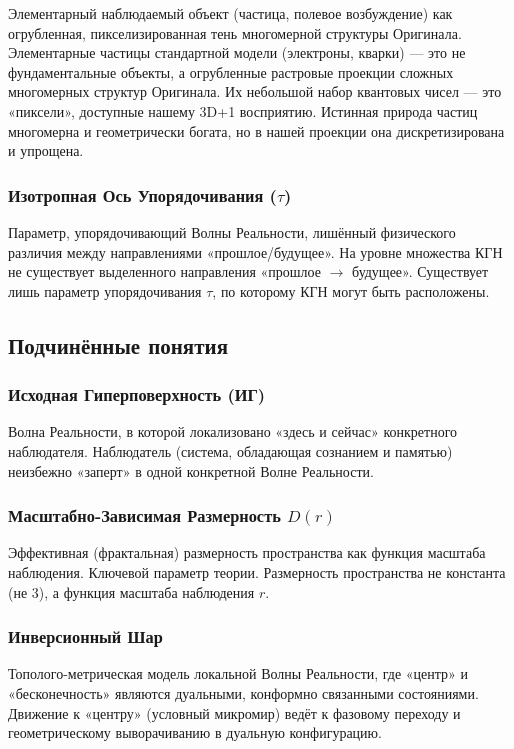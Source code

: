 \documentclass[a4paper,12pt]{article}
\begin{document}
Элементарный наблюдаемый объект (частица, полевое возбуждение) как огрубленная, пикселизированная тень многомерной структуры Оригинала. Элементарные частицы стандартной модели (электроны, кварки) — это не фундаментальные объекты, а огрубленные растровые проекции сложных многомерных структур Оригинала. Их небольшой набор квантовых чисел — это «пиксели», доступные нашему 3D+1 восприятию. Истинная природа частиц многомерна и геометрически богата, но в нашей проекции она дискретизирована и упрощена.

\subsubsection{Изотропная Ось Упорядочивания ($\tau$)}

Параметр, упорядочивающий Волны Реальности, лишённый физического различия между направлениями «прошлое/будущее». На уровне множества КГН не существует выделенного направления «прошлое $\to$ будущее». Существует лишь параметр упорядочивания $\tau$, по которому КГН могут быть расположены.

\subsection{Подчинённые понятия}

\subsubsection{Исходная Гиперповерхность (ИГ)}

Волна Реальности, в которой локализовано «здесь и сейчас» конкретного наблюдателя. Наблюдатель (система, обладающая сознанием и памятью) неизбежно «заперт» в одной конкретной Волне Реальности.

\subsubsection{Масштабно-Зависимая Размерность $D(r)$}

Эффективная (фрактальная) размерность пространства как функция масштаба наблюдения. Ключевой параметр теории. Размерность пространства не константа (не 3), а функция масштаба наблюдения $r$.

\subsubsection{Инверсионный Шар}

Тополого-метрическая модель локальной Волны Реальности, где «центр» и «бесконечность» являются дуальными, конформно связанными состояниями. Движение к «центру» (условный микромир) ведёт к фазовому переходу и геометрическому выворачиванию в дуальную конфигурацию.
\end{document}
